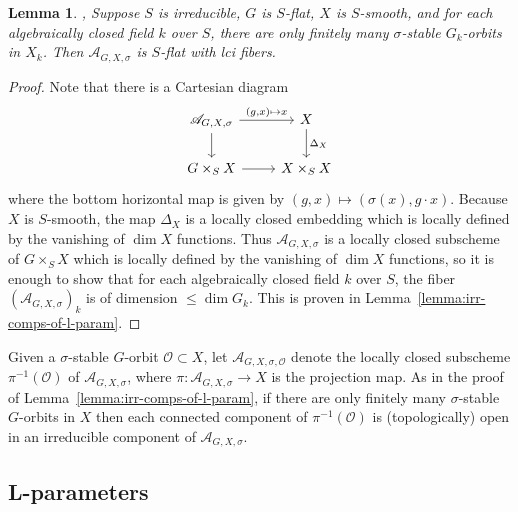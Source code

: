 \documentclass[11pt,reqno]{amsart}
\newtheorem{lemma}[theorem]{Lemma}
\theoremstyle{definition}
\newcommand{\cO}{\mathcal{O}}
\newcommand{\sA}{{\mathscr A}}
\begin{document}
\begin{lemma}\label{lemma:flatness-of-l-param}
    \cite[Corollary 2.5]{DHKM}, \cite[Proposition 3.1.6]{Zhu} Suppose $S$ is irreducible, $G$ is $S$-flat, $X$ is $S$-smooth, and for each algebraically closed field $k$ over $S$, there are only finitely many $\sigma$-stable $G_k$-orbits in $X_k$. Then $\sA_{G, X, \sigma}$ is $S$-flat with lci fibers.
\end{lemma}

\begin{proof}
    Note that there is a Cartesian diagram
    \[
    \begin{tikzcd}
        \sA_{G, X, \sigma} \arrow[r, "{(g, x)} \mapsto x"] \arrow[d]
            &X \arrow[d, "\Delta_X"] \\
        G \times_S X \arrow[r]
            &X \times_S X
    \end{tikzcd}
    \]
    where the bottom horizontal map is given by $(g, x) \mapsto (\sigma(x), g \cdot x)$. Because $X$ is $S$-smooth, the map $\Delta_X$ is a locally closed embedding which is locally defined by the vanishing of $\dim X$ functions. Thus $\sA_{G, X, \sigma}$ is a locally closed subscheme of $G \times_S X$ which is locally defined by the vanishing of $\dim X$ functions, so it is enough to show that for each algebraically closed field $k$ over $S$, the fiber $(\sA_{G, X, \sigma})_k$ is of dimension $\leq \dim G_k$. This is proven in Lemma~\ref{lemma:irr-comps-of-l-param}.
\end{proof}

Given a $\sigma$-stable $G$-orbit $\cO \subset X$, let $\sA_{G,X,\sigma,\cO}$ denote the locally closed subscheme $\pi^{-1}(\cO)$ of $\sA_{G,X,\sigma}$, where $\pi\colon \sA_{G,X,\sigma} \to X$ is the projection map. As in the proof of Lemma~\ref{lemma:irr-comps-of-l-param}, if there are only finitely many $\sigma$-stable $G$-orbits in $X$ then each connected component of $\pi^{-1}(\cO)$ is (topologically) open in an irreducible component of $\sA_{G,X,\sigma}$.





\subsection{L-parameters}\label{ss:l-param}
\end{document}
